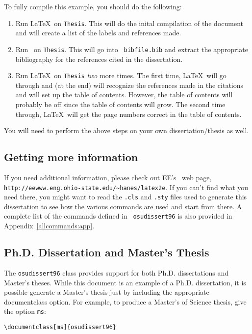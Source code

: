 To fully compile this example, you should do the following:
%
\begin{enumerate}
\item Run \LaTeX\ on {\tt Thesis}.  This will do the inital
compilation of the document and will create a list of the labels and
references made.
%
\item Run \BibTeX\ on {\tt Thesis}.  This will go into {\tt
bibfile.bib} and extract the appropriate bibliography for the
references  cited in the dissertation.
%
\item Run \LaTeX\ on {\tt Thesis} {\em two} more times.  
The first time, \LaTeX\ will go through and (at the end) will
recognize the references made in the citations and will set up the
table of contents. However, the table of contents will probably be off
since the table of contents will grow.  The second time through,
\LaTeX\ will get the page numbers correct in the table of contents.
\end{enumerate}
%
You will need to perform the above steps on your own
dissertation/thesis as well.

\subsection{Getting more information}

If you need additional information, please check out EE's \LaTeXe\ web
page, {\verb+http://eewww.eng.ohio-state.edu/~hanes/latex2e+}.  If you
can't find what you need there, you might want to read the {\tt .cls} and
{\tt .sty} files used
to generate this dissertation to see how the various commands are used and
start from there. A complete list of the commands defined in {\tt
osudissert96} is also provided in Appendix~\ref{allcommands:app}.

\subsection{Ph.D. Dissertation and Master's Thesis}

The {\tt osudissert96} class provides support for both Ph.D.
dissertations and Master's theses. While this document is an example
of a Ph.D.  dissertation, it is possible generate a Master's thesis
just by including the appropriate documentclass option.  For example, to
produce a Master's of Science thesis, give the option {\tt ms}:

\begin{center}
{\verb+\documentclass[ms]{osudissert96}+}
\end{center}

